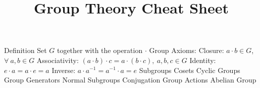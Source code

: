 \documentclass[14pt]{extarticle}
\title{Group Theory Cheat Sheet}
\begin{document}
	\maketitle
	\begin{outline}		
		\1	Definition
			\2	Set $G$ together with the operation $\cdot$
			\2	Group Axioms:
				\3	Closure:	$a \cdot b \in G$, $\forall~a,b \in G$
				\3	Associativity:	$(a \cdot b) \cdot c = a \cdot (b \cdot c),~a,b,c \in G$
				\3	Identity:	$e \cdot a = a \cdot e = a$
				\3	Inverse: $a \cdot a^{-1} = a^{-1} \cdot a = e$
		\1	Subgroups
		\1	Cosets
		\1	Cyclic Groups
		\1	Group Generators
		\1	Normal Subgroups
		\1	Conjugation
		\1	Group Actions
		\1	Abelian Group
	\end{outline}
\end{document}
